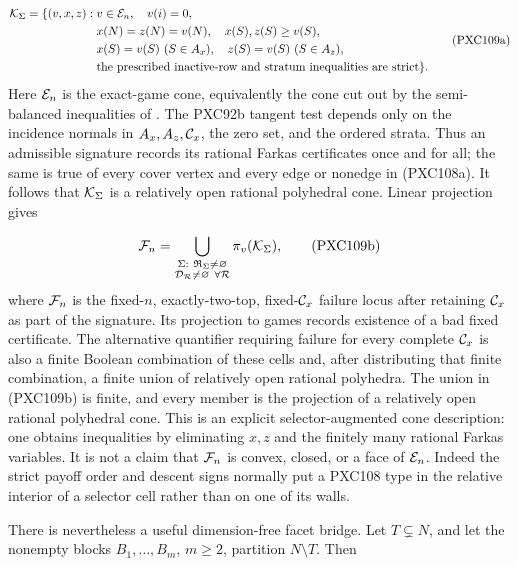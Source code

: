 \documentclass[11pt]{article}
\begin{document}
\begin{equation}
\begin{split}
 {\cal K}_\Sigma=\{(v,x,z):\;&v\in{\cal E}_n,\quad v(i)=0,\\
 &x(N)=z(N)=v(N),\quad x(S),z(S)\ge v(S),\\
 &x(S)=v(S)\ (S\in A_x),\quad z(S)=v(S)\ (S\in A_z),\\
 &\text{the prescribed inactive-row and stratum inequalities are strict}\}.
\end{split}
\tag{PXC109a}
\end{equation}
Here \({\cal E}_n\) is the exact-game cone, equivalently the cone cut out by
the semi-balanced inequalities of \citet{StudenyKratochvil2022}.  The
PXC92b tangent test depends only on the incidence normals in
\(A_x,A_z,{\cal C}_x\), the zero set, and the ordered strata.  Thus an
admissible signature records its rational Farkas certificates once and for
all; the same is true of every cover vertex and every edge or nonedge in
(PXC108a).  It follows that \({\cal K}_\Sigma\) is a relatively open rational
polyhedral cone.  Linear projection gives

\begin{equation}
 {\cal F}_n=
 \bigcup_{\substack{\Sigma:\ {\mathfrak R}_\Sigma\ne\varnothing\\
                    {\cal D}_{\cal R}\ne\varnothing\ \forall {\cal R}}}
       \pi_v({\cal K}_\Sigma),                              \tag{PXC109b}
\end{equation}
where \({\cal F}_n\) is the fixed-\(n\), exactly-two-top,
fixed-\({\cal C}_x\) failure locus after retaining \({\cal C}_x\) as part of
the signature.  Its projection to games records existence of a bad fixed
certificate.  The alternative quantifier requiring failure for every
complete \({\cal C}_x\) is also a finite Boolean combination of these cells
and, after distributing that finite combination, a finite union of
relatively open rational polyhedra.  The union in (PXC109b) is finite, and
every member is the projection of a relatively open rational polyhedral
cone.  This is an explicit selector-augmented cone description: one obtains
inequalities by eliminating \(x,z\) and the finitely many rational Farkas
variables.  It is not a claim that \({\cal F}_n\) is convex, closed, or a
face of \({\cal E}_n\).  Indeed the strict payoff order and descent signs
normally put a PXC108 type in the relative interior of a selector cell rather
than on one of its walls.

There is nevertheless a useful dimension-free facet bridge.  Let
\(T\subsetneq N\), and let the nonempty blocks
\(B_1,\ldots,B_m\), \(m\ge2\), partition \(N\setminus T\).  Then
\end{document}
